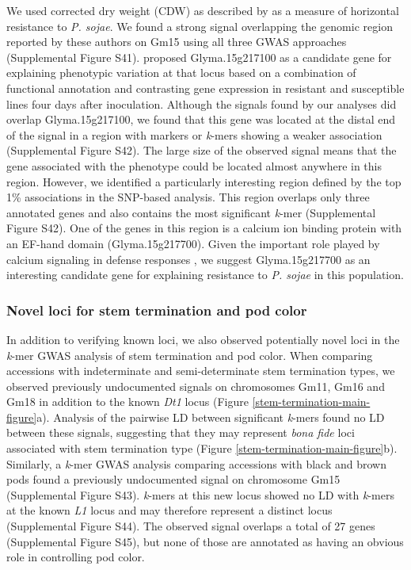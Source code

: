 \documentclass{article}
\begin{document}
We used corrected dry weight (CDW) as described by  as a
measure of horizontal resistance to \emph{P. sojae}. We found a strong signal
overlapping the genomic region reported by these authors on Gm15 using all three GWAS
approaches (Supplemental Figure S41). 
proposed Glyma.15g217100 as a candidate gene for explaining phenotypic
variation at that locus based on a combination of functional annotation and
contrasting gene expression in resistant and susceptible lines four days after
inoculation. Although the signals found by our analyses did overlap
Glyma.15g217100, we found that this gene was located at the distal end of the signal
in a region with markers or \emph{k}-mers showing a weaker
association (Supplemental Figure S42). The
large size of the observed signal means that the gene associated with the phenotype could
be located almost anywhere in this region. However, we identified a particularly
interesting region defined by the top 1\% associations in the SNP-based
analysis. This region overlaps only three annotated genes and also contains the
most significant \emph{k}-mer (Supplemental Figure
S42). One of the genes in this region is
a calcium ion binding protein with an EF-hand domain (Glyma.15g217700).
Given the important role played by calcium signaling in defense
responses , we suggest Glyma.15g217700 as an interesting
candidate gene for explaining resistance to \emph{P. sojae} in this population.

\subsubsection*{Novel loci for stem termination and pod color}

In addition to verifying known loci, we also observed potentially novel loci in
the \textit{k}-mer GWAS analysis of stem termination and pod color.  When
comparing accessions with indeterminate and semi-determinate stem termination
types, we observed previously undocumented signals on chromosomes Gm11, Gm16
and Gm18 in addition to the known \textit{Dt1} locus (Figure
\ref{stem-termination-main-figure}a).  Analysis of the pairwise LD between
significant \textit{k}-mers found no LD between these signals, suggesting that
they may represent \textit{bona fide} loci associated with stem termination
type (Figure \ref{stem-termination-main-figure}b). Similarly, a \textit{k}-mer
GWAS analysis comparing accessions with black and brown pods found a previously
undocumented signal on chromosome Gm15 (Supplemental Figure S43).
\textit{k}-mers at this new locus
showed no LD with \textit{k}-mers at the known \textit{L1} locus and may
therefore represent a distinct locus (Supplemental Figure 
S44). The observed signal overlaps a total of 27 genes
(Supplemental Figure S45), but none of those are annotated
as having an obvious role in controlling pod color.
\end{document}
